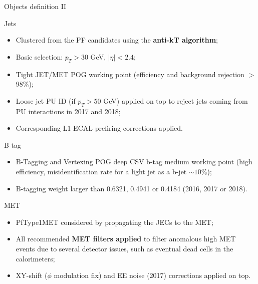 \documentclass[8pt]{beamer}
\begin{document}
\begin{frame}{Objects definition II}
\justifying
\vspace{5pt} \begin{block}{\centering Jets}\end{block}
\begin{itemize}
\justifying
\item Clustered from the PF candidates using the \textbf{anti-kT algorithm};
\item Basic selection: $p_T > 30$ GeV, $|\eta| < 2.4$;
\item \alert{Tight JET/MET POG} working point (efficiency and background rejection $>$ 98\%);
\item Loose jet PU ID (if $p_T > 50$ GeV) applied on top to reject jets coming from PU interactions in 2017 and 2018;
\item Corresponding L1 ECAL prefiring corrections applied.
\end{itemize} \vfill

\vspace{5pt}
\begin{block}{\centering B-tag}\end{block}
\begin{itemize}
\justifying
\item B-Tagging and Vertexing POG \alert{deep CSV b-tag medium working point} (high efficiency, misidentification rate for a light jet as a b-jet $\sim 10\%$);
\item B-tagging weight larger than 0.6321, 0.4941 or 0.4184 (2016, 2017 or 2018).
\end{itemize} \vfill

\vspace{5pt}
\begin{block}{\centering MET}\end{block}
\begin{itemize}
\justifying
\item \alert{PfType1MET} considered by propagating the JECs to the MET;
\item All recommended \textbf{MET filters applied} to filter anomalous high MET events due to several detector issues, such as eventual dead cells in the calorimeters;
\item XY-shift ($\phi$ modulation fix) and EE noise (2017) corrections applied on top.
\end{itemize} \vfill
\end{frame}
\end{document}
